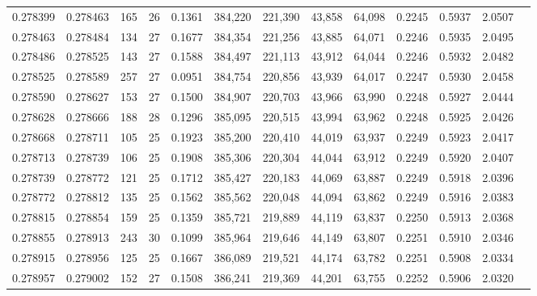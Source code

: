 \begin{tabular}{rrrrrrrrrrrrr}
0.278399 & 0.278463 &   165 &  26 &                                     0.1361 & 384,220 & 221,390 &  43,858 &  64,098 & 0.2245 & 0.5937 & 2.0507 \\
0.278463 & 0.278484 &   134 &  27 &                                     0.1677 & 384,354 & 221,256 &  43,885 &  64,071 & 0.2246 & 0.5935 & 2.0495 \\
0.278486 & 0.278525 &   143 &  27 &                                     0.1588 & 384,497 & 221,113 &  43,912 &  64,044 & 0.2246 & 0.5932 & 2.0482 \\
0.278525 & 0.278589 &   257 &  27 &                                     0.0951 & 384,754 & 220,856 &  43,939 &  64,017 & 0.2247 & 0.5930 & 2.0458 \\
0.278590 & 0.278627 &   153 &  27 &                                     0.1500 & 384,907 & 220,703 &  43,966 &  63,990 & 0.2248 & 0.5927 & 2.0444 \\
0.278628 & 0.278666 &   188 &  28 &                                     0.1296 & 385,095 & 220,515 &  43,994 &  63,962 & 0.2248 & 0.5925 & 2.0426 \\
0.278668 & 0.278711 &   105 &  25 &                                     0.1923 & 385,200 & 220,410 &  44,019 &  63,937 & 0.2249 & 0.5923 & 2.0417 \\
0.278713 & 0.278739 &   106 &  25 &                                     0.1908 & 385,306 & 220,304 &  44,044 &  63,912 & 0.2249 & 0.5920 & 2.0407 \\
0.278739 & 0.278772 &   121 &  25 &                                     0.1712 & 385,427 & 220,183 &  44,069 &  63,887 & 0.2249 & 0.5918 & 2.0396 \\
0.278772 & 0.278812 &   135 &  25 &                                     0.1562 & 385,562 & 220,048 &  44,094 &  63,862 & 0.2249 & 0.5916 & 2.0383 \\
0.278815 & 0.278854 &   159 &  25 &                                     0.1359 & 385,721 & 219,889 &  44,119 &  63,837 & 0.2250 & 0.5913 & 2.0368 \\
0.278855 & 0.278913 &   243 &  30 &                                     0.1099 & 385,964 & 219,646 &  44,149 &  63,807 & 0.2251 & 0.5910 & 2.0346 \\
0.278915 & 0.278956 &   125 &  25 &                                     0.1667 & 386,089 & 219,521 &  44,174 &  63,782 & 0.2251 & 0.5908 & 2.0334 \\
0.278957 & 0.279002 &   152 &  27 &                                     0.1508 & 386,241 & 219,369 &  44,201 &  63,755 & 0.2252 & 0.5906 & 2.0320 \\

\end{tabular}
